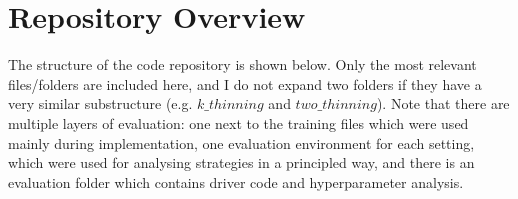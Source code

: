 \section{Repository Overview}

The structure of the code repository is shown below. Only the most relevant files/folders are included here, and I do not expand two folders if they have a very similar substructure (e.g. $k\_thinning$ and $two\_thinning$). Note that there are multiple layers of evaluation: one next to the training files which were used mainly during implementation, one evaluation environment for each setting, which were used for analysing strategies in a principled way, and there is an evaluation folder which contains driver code and hyperparameter analysis.



